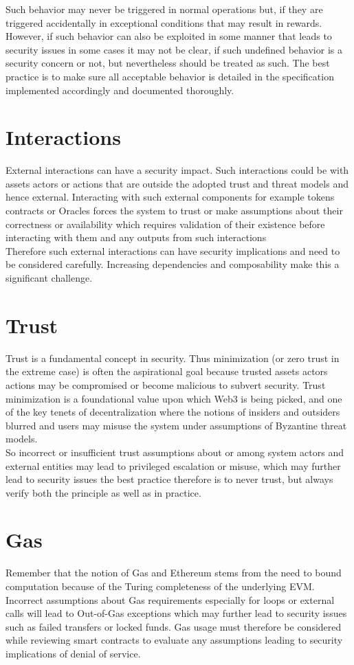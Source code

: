 Such behavior may never be triggered in normal operations but, if they are triggered accidentally in exceptional conditions that may result in rewards. However, if such behavior can also be exploited in some manner that leads to security issues in some cases it may not be clear, if such undefined behavior is a security concern or not, but nevertheless should be treated as such. The best practice is to make sure all acceptable behavior is detailed in the specification implemented accordingly and documented thoroughly.

\section{Interactions}
External interactions can have a security impact. Such interactions could be with assets actors or actions that are outside the adopted trust and threat models and hence external. Interacting with such external components for example tokens contracts or Oracles forces the system to trust or make assumptions about their correctness or availability which requires validation of their existence before interacting with them and any outputs from such interactions\\

Therefore such external interactions can have security implications and need to be considered carefully. Increasing dependencies and composability make this a significant challenge.

\section{Trust}
Trust is a fundamental concept in security. Thus minimization (or zero trust in the extreme case) is often the aspirational goal because trusted assets actors actions may be compromised or become malicious to subvert security. Trust minimization is a foundational value upon which Web3 is being picked, and one of the key tenets of decentralization where the notions of insiders and outsiders blurred and users may misuse the system under assumptions of Byzantine threat models.\\

So incorrect or insufficient trust assumptions about or among system actors and external entities may lead to privileged escalation or misuse, which may further lead to security issues the best practice therefore is to never trust, but always verify both the principle as well as in practice.

\section{Gas}
Remember that the notion of Gas and Ethereum stems from the need to bound computation because of the Turing completeness of the underlying EVM.  Incorrect assumptions about Gas requirements especially for loops or external calls will lead to Out-of-Gas exceptions which may further lead to security issues such as failed transfers or locked funds. Gas usage must therefore be considered while reviewing smart contracts to evaluate any assumptions leading to security implications of denial of service.

